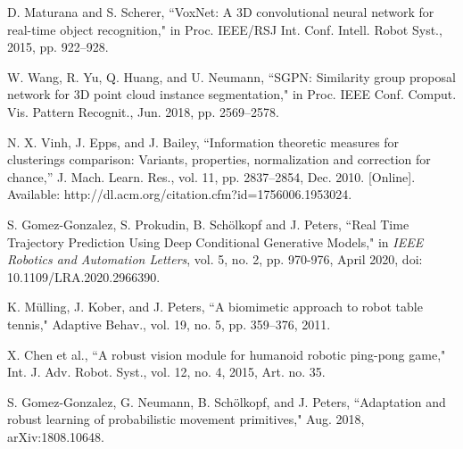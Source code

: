 \documentclass[letterpaper,12pt]{article}
\begin{document}
\begin{thebibliography}{99}
\bibitem{} D. Maturana and S. Scherer, ``VoxNet: A 3D convolutional neural
network for real-time object recognition," in Proc. IEEE/RSJ Int. Conf.
Intell. Robot Syst., 2015, pp. 922--928.

\bibitem{} W. Wang, R. Yu, Q. Huang, and U. Neumann, ``SGPN: Similarity
group proposal network for 3D point cloud instance segmentation," in
Proc. IEEE Conf. Comput. Vis. Pattern Recognit., Jun. 2018, pp.
2569--2578.

\bibitem{} N. X. Vinh, J. Epps, and J. Bailey, ``Information theoretic
measures for clusterings comparison: Variants, properties, normalization
and correction for chance,'' J. Mach. Learn. Res., vol. 11, pp.
2837--2854, Dec. 2010. {[}Online{]}. Available:
http://dl.acm.org/citation.cfm?id=1756006.1953024.

\bibitem{} S. Gomez-Gonzalez, S. Prokudin, B. Schölkopf and J. Peters,
``Real Time Trajectory Prediction Using Deep Conditional Generative
Models," in \emph{IEEE Robotics and Automation Letters}, vol. 5, no. 2,
pp. 970-976, April 2020, doi: 10.1109/LRA.2020.2966390.

\bibitem{} K. Mülling, J. Kober, and J. Peters, ``A biomimetic approach to
robot table tennis," Adaptive Behav., vol. 19, no. 5, pp. 359--376,
2011.

\bibitem{} X. Chen et al., ``A robust vision module for humanoid robotic
ping-pong game," Int. J. Adv. Robot. Syst., vol. 12, no. 4, 2015, Art.
no. 35.

\bibitem{} S. Gomez-Gonzalez, G. Neumann, B. Schölkopf, and J. Peters,
``Adaptation and robust learning of probabilistic movement primitives,"
Aug. 2018, arXiv:1808.10648.

\end{thebibliography}
\end{document}
